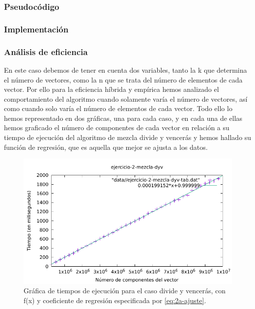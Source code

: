 \begin{figure}
\end{figure}

\subsubsection{Pseudocódigo}



\subsubsection{Implementación}



\subsubsection{Análisis de eficiencia}


En este caso debemos de tener en cuenta dos variables, tanto la k que determina el número de vectores, como la n que se trata del número de elementos de cada vector.
Por ello para la eficiencia híbrida y empírica hemos analizado el comportamiento del algoritmo cuando solamente varía el número de vectores, así como cuando solo varía el número de 
elementos de cada vector. 
Todo ello lo hemos representado en dos gráficas, una para cada caso, y en cada una de ellas hemos graficado el número de componentes de cada vector en relación a su tiempo de ejecución del algoritmo de mezcla
divide y vencerás y hemos hallado su función de regresión, que es aquella que mejor se ajusta a los datos.


\begin{figure}[h]
    \centering
    \includegraphics[scale=0.76]{img/e2-dyv-n.pdf}
    \caption{Gráfica de tiempos de ejecución para el caso divide y vencerás, 
    con f(x) y coeficiente de regresión especificada por \ref{eq:2a-ajuste}.}
    \label{fig:2a-obvio-n-graph}
\end{figure}


